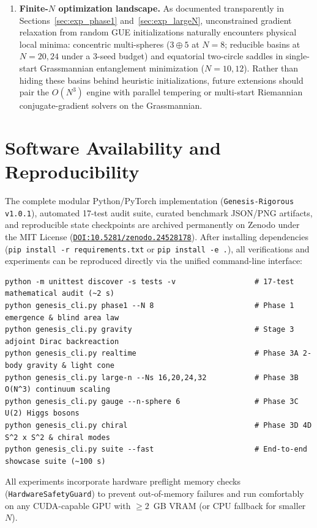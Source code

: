 \documentclass[11pt,a4paper]{article}
\begin{document}
\begin{enumerate}
  \item \textbf{Finite-$N$ optimization landscape.}
  As documented transparently in Sections~\ref{sec:exp_phase1} and~\ref{sec:exp_largeN}, unconstrained gradient relaxation from random GUE initializations naturally encounters physical local minima: concentric multi-spheres ($3\oplus 5$ at $N=8$; reducible basins at $N=20, 24$ under a 3-seed budget) and equatorial two-circle saddles in single-start Grassmannian entanglement minimization ($N=10, 12$). Rather than hiding these basins behind heuristic initializations, future extensions should pair the $O(N^3)$ engine with parallel tempering or multi-start Riemannian conjugate-gradient solvers on the Grassmannian.
\end{enumerate}

\section{Software Availability and Reproducibility}
\label{sec:repro}

The complete modular Python/PyTorch implementation (\texttt{Genesis-Rigorous v1.0.1}), automated 17-test audit suite, curated benchmark JSON/PNG artifacts, and reproducible state checkpoints are archived permanently on Zenodo under the MIT License (\href{https://doi.org/10.5281/zenodo.24528178}{\texttt{DOI:10.5281/zenodo.24528178}}). After installing dependencies (\texttt{pip install -r requirements.txt} or \texttt{pip install -e .}), all verifications and experiments can be reproduced directly via the unified command-line interface:
\begin{verbatim}
python -m unittest discover -s tests -v                  # 17-test mathematical audit (~2 s)
python genesis_cli.py phase1 --N 8                       # Phase 1 emergence & blind area law
python genesis_cli.py gravity                            # Stage 3 adjoint Dirac backreaction
python genesis_cli.py realtime                           # Phase 3A 2-body gravity & light cone
python genesis_cli.py large-n --Ns 16,20,24,32           # Phase 3B O(N^3) continuum scaling
python genesis_cli.py gauge --n-sphere 6                 # Phase 3C U(2) Higgs bosons
python genesis_cli.py chiral                             # Phase 3D 4D S^2 x S^2 & chiral modes
python genesis_cli.py suite --fast                       # End-to-end showcase suite (~100 s)
\end{verbatim}
All experiments incorporate hardware preflight memory checks (\texttt{HardwareSafetyGuard}) to prevent out-of-memory failures and run comfortably on any CUDA-capable GPU with $\ge 2$~GB VRAM (or CPU fallback for smaller $N$).



\end{document}
